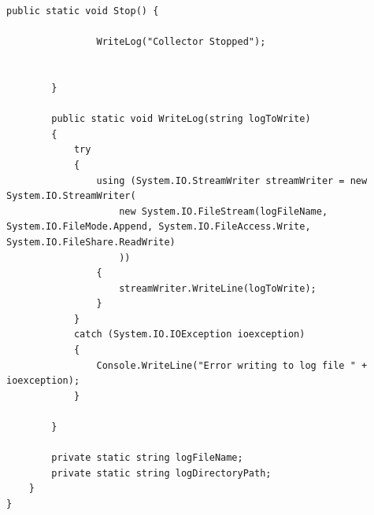 \begin{Answer}
\begin{lstlisting}[caption=Data Recorder Class,  label=code:DataRecorder]
        public static void Stop() {

                WriteLog("Collector Stopped");
            
        
        }

        public static void WriteLog(string logToWrite)
        {
            try
            {
                using (System.IO.StreamWriter streamWriter = new System.IO.StreamWriter(
                    new System.IO.FileStream(logFileName, System.IO.FileMode.Append, System.IO.FileAccess.Write, System.IO.FileShare.ReadWrite)
                    ))
                {
                    streamWriter.WriteLine(logToWrite);
                }
            }
            catch (System.IO.IOException ioexception)
            {
                Console.WriteLine("Error writing to log file " + ioexception);
            }
        
        }

        private static string logFileName;
        private static string logDirectoryPath;
    }
}

\end{lstlisting}
\end{Answer}

